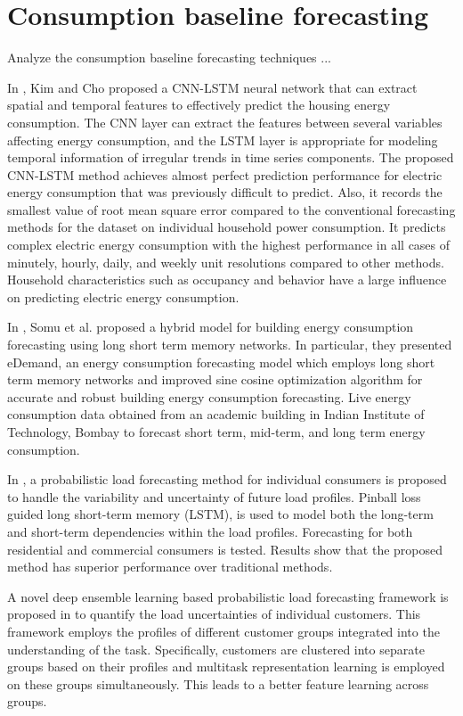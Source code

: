 \section{Consumption baseline forecasting}
\label{sec:baselinesoa}
\vspace{0.2 cm}

Analyze the consumption baseline forecasting techniques ...

In \cite{KIM201972}, Kim and Cho proposed a CNN-LSTM neural network that can extract spatial and temporal features to effectively predict the housing energy consumption.
The CNN layer can extract the features between several variables affecting energy consumption, and the LSTM layer is appropriate for modeling temporal information of irregular trends in time series components. The proposed CNN-LSTM method achieves almost perfect prediction performance for electric energy consumption that was previously difficult to predict.
Also, it records the smallest value of root mean square error compared to the conventional forecasting methods for the dataset on individual household power consumption.
It predicts complex electric energy consumption with the highest performance in all cases of minutely, hourly, daily, and weekly unit resolutions compared to other methods.
Household characteristics such as occupancy and behavior have a large influence on predicting electric energy consumption.

In \cite{SOMU2020114131}, Somu et al. proposed a hybrid model for building energy consumption forecasting using long short term memory networks.
In particular, they presented eDemand, an energy consumption forecasting model which employs long short term memory networks and improved sine cosine optimization algorithm for accurate and robust building energy consumption forecasting.
Live energy consumption data obtained from an academic building in Indian Institute of Technology, Bombay to forecast short term, mid-term, and long term energy consumption.

In \cite{WANG201910}, a probabilistic load forecasting method for individual consumers is proposed to handle the variability and uncertainty of future load profiles.
Pinball loss guided long short-term memory (LSTM), is used to model both the long-term and short-term dependencies within the load profiles.
Forecasting for both residential and commercial consumers is tested.
Results show that the proposed method has superior performance over traditional methods.

A novel deep ensemble learning based probabilistic load forecasting framework is proposed in \cite{YANG2019116324} to quantify the load uncertainties of individual customers.
This framework employs the profiles of different customer groups integrated into the understanding of the task.
Specifically, customers are clustered into separate groups based on their profiles and multitask representation learning is employed on these groups simultaneously.
This leads to a better feature learning across groups.

